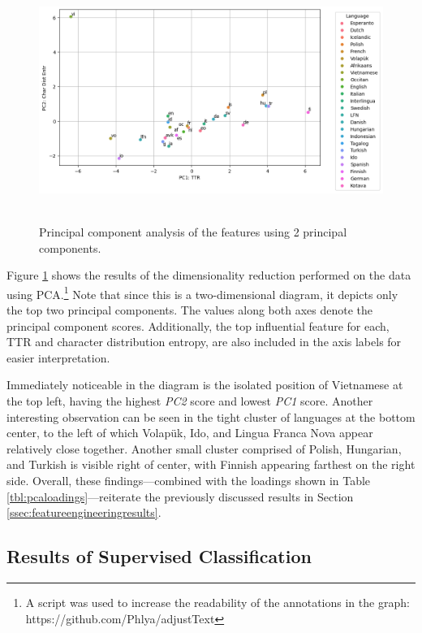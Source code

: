 \documentclass[12pt,a4paper]{article}
\numberwithin{figure}{section}
\numberwithin{table}{section}
\numberwithin{definition}{section}
\begin{document}
\begin{figure}[!h]
  \centering
    \caption{Principal component analysis of the features using 2 principal components.}
    \includegraphics[width=1.0\textwidth]{PCA_of_Features.png}
    \label{fig:pcaanalysis}\
\end{figure}

Figure \ref{fig:pcaanalysis} shows the results of the dimensionality reduction performed on the data using PCA.\footnote{A script was used to increase the readability of the annotations in the graph: https://github.com/Phlya/adjustText} Note that since this is a two-dimensional diagram, it depicts only the top two principal components. The values along both axes denote the principal component scores. Additionally, the top influential feature for each, TTR and character distribution entropy, are also included in the axis labels for easier interpretation. 

Immediately noticeable in the diagram is the isolated position of Vietnamese at the top left, having the highest \textit{PC2} score and lowest \textit{PC1} score. Another interesting observation can be seen in the tight cluster of languages at the bottom center, to the left of which Volapük, Ido, and Lingua Franca Nova appear relatively close together. Another small cluster comprised of Polish, Hungarian, and Turkish is visible right of center, with Finnish appearing farthest on the right side. Overall, these findings---combined with the loadings shown in Table \ref{tbl:pcaloadings}---reiterate the previously discussed results in Section \ref{ssec:featureengineeringresults}.


\subsection{Results of Supervised Classification}
\label{ssec:classificationresults}
\end{document}
